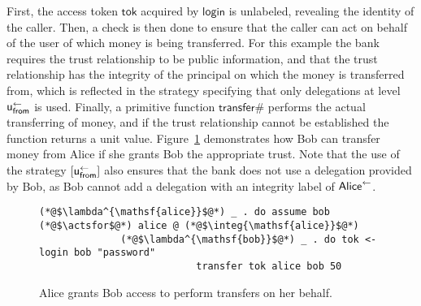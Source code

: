 First, the access token $\mathsf{tok}$ acquired by $\mathsf{login}$ is unlabeled, revealing the identity of the caller. Then, a check is then done to ensure that the caller can act on behalf of the user of which money is being transferred. For this example the bank requires the trust relationship to be public information, and that the trust relationship has the integrity of the principal on which the money is transferred from, which is reflected in the strategy specifying that only delegations at level $\mathsf{u}_{\mathsf{from}}^{\leftarrow}$ is used. Finally, a primitive function $\mathsf{transfer\#}$ performs the actual transferring of money, and if the trust relationship cannot be established the function returns a unit value. Figure~\ref{fig:bob-transfer-from-alice} demonstrates how Bob can transfer money from Alice if she grants Bob the appropriate trust. Note that the use of the strategy $[\mathsf{u}_{\mathsf{from}}^{\leftarrow}]$ also ensures that the bank does not use a delegation provided by Bob, as Bob cannot add a delegation with an integrity label of $\mathsf{Alice}^{\leftarrow}$.

\begin{figure}
\centering
\begin{lstlisting}
(*@$\lambda^{\mathsf{alice}}$@*) _ . do assume bob (*@$\actsfor$@*) alice @ (*@$\integ{\mathsf{alice}}$@*)
              (*@$\lambda^{\mathsf{bob}}$@*) _ . do tok <- login bob "password"
                           transfer tok alice bob 50
\end{lstlisting}
\caption{Alice grants Bob access to perform transfers on her behalf.}
\label{fig:bob-transfer-from-alice}
\end{figure}